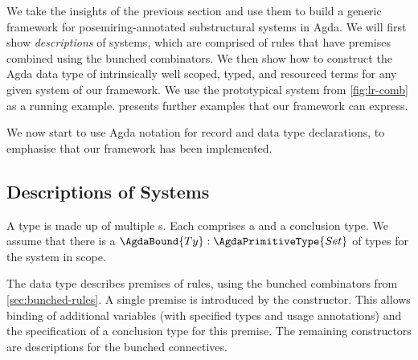 We take the insights of the previous section and use them to build a
generic framework for posemiring-annotated substructural systems in
Agda. We will first show \emph{descriptions} of systems, which are
comprised of rules that have premises combined using the bunched
combinators. We then show how to construct the Agda data type of
intrinsically well scoped, typed, and resourced terms for any given
system of our framework. We use the prototypical system from
\cref{fig:lr-comb} as a running example. 
presents further examples that our framework can express.

We now start to use Agda notation for record and data type
declarations, to emphasise that our framework has been implemented.

\subsection{Descriptions of Systems}



A type  is made up of multiple s.
Each  comprises a  and
a conclusion type. We assume that there is a
$\AgdaBound{Ty} : \AgdaPrimitiveType{Set}$ of types for the system in
scope.

The  data type describes premises of rules,
using the bunched combinators from \cref{sec:bunched-rules}. A single
premise is introduced by the
constructor.  This allows binding of additional variables
\AgdaBound{$\Delta$} (with specified types and usage annotations) and
the specification of a conclusion type  for this premise.
The remaining constructors are descriptions for the
bunched connectives. %

